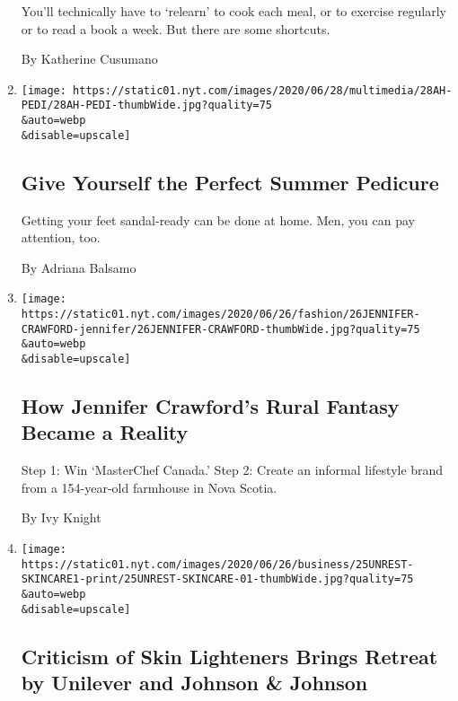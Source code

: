 \begin{enumerate}
  You'll technically have to `relearn' to cook each meal, or to exercise
  regularly or to read a book a week. But there are some shortcuts.

  By Katherine Cusumano
\item
  \href{/2020/06/27/at-home/coronavirus-DIY-pedicure.html}{}

  \texttt{[image: https://static01.nyt.com/images/2020/06/28/multimedia/28AH-PEDI/28AH-PEDI-thumbWide.jpg?quality=75\\\&auto=webp\\\&disable=upscale]}

  \hypertarget{give-yourself-the-perfect-summer-pedicure}{%
  \subsection{Give Yourself the Perfect Summer
  Pedicure}\label{give-yourself-the-perfect-summer-pedicure}}

  Getting your feet sandal-ready can be done at home. Men, you can pay
  attention, too.

  By Adriana Balsamo
\item
  \href{/2020/06/26/style/self-care/how-jennifer-crawfords-rural-fantasy-became-a-reality.html}{}

  \texttt{[image: https://static01.nyt.com/images/2020/06/26/fashion/26JENNIFER-CRAWFORD-jennifer/26JENNIFER-CRAWFORD-thumbWide.jpg?quality=75\\\&auto=webp\\\&disable=upscale]}

  \hypertarget{how-jennifer-crawfords-rural-fantasy-became-a-reality}{%
  \subsection{How Jennifer Crawford's Rural Fantasy Became a
  Reality}\label{how-jennifer-crawfords-rural-fantasy-became-a-reality}}

  Step 1: Win `MasterChef Canada.' Step 2: Create an informal lifestyle
  brand from a 154-year-old farmhouse in Nova Scotia.

  By Ivy Knight
\item
  \href{/2020/06/25/business/unilever-jj-skin-care-lightening.html}{}

  \texttt{[image: https://static01.nyt.com/images/2020/06/26/business/25UNREST-SKINCARE1-print/25UNREST-SKINCARE-01-thumbWide.jpg?quality=75\\\&auto=webp\\\&disable=upscale]}

  \hypertarget{criticism-of-skin-lighteners-brings-retreat-by-unilever-and-johnson--johnson}{%
  \subsection{Criticism of Skin Lighteners Brings Retreat by Unilever
  and Johnson \&
  Johnson}\label{criticism-of-skin-lighteners-brings-retreat-by-unilever-and-johnson--johnson}}


\end{enumerate}
